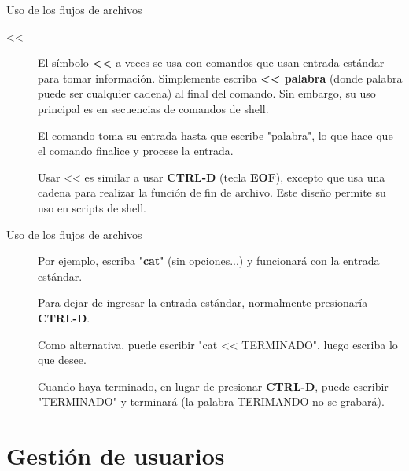 \begin{frame}[c]{Uso de los flujos de archivos}
  \begin{description}
    \item[<{}<]
      El símbolo \textbf{<{}<} a veces se usa con comandos que usan entrada
      estándar para tomar información. Simplemente escriba \textbf{<{}<
      palabra} (donde palabra puede ser cualquier cadena) al final del
      comando. Sin embargo, su uso principal es en secuencias de comandos de
      shell.

      \vspace{\baselineskip}
      El comando toma su entrada hasta que escribe "palabra",
      lo que hace que el comando finalice y procese la entrada.

      \vspace{\baselineskip}
      Usar << es similar a usar \textbf{CTRL-D} (tecla \textbf{EOF}),
      excepto que usa una cadena para realizar la función de fin de archivo.
      Este diseño permite su uso en scripts de shell.
  \end{description}
\end{frame}

\begin{frame}[c]{Uso de los flujos de archivos}
  \begin{description}
    \item[]
      \vspace{\baselineskip}
      Por ejemplo, escriba "\textbf{cat}" (sin opciones...) y funcionará con
      la entrada estándar.

      \vspace{\baselineskip}
      Para dejar de ingresar la entrada estándar, normalmente presionaría
      \textbf{CTRL-D}.

      \vspace{\baselineskip}
      Como alternativa, puede escribir "cat <{}< TERMINADO", luego escriba lo
      que desee.

      \vspace{\baselineskip}
      Cuando haya terminado, en lugar de presionar \textbf{CTRL-D}, puede
      escribir "TERMINADO" y terminará (la palabra TERIMANDO no se grabará).
  \end{description}
\end{frame}


\section{Gestión de usuarios}

